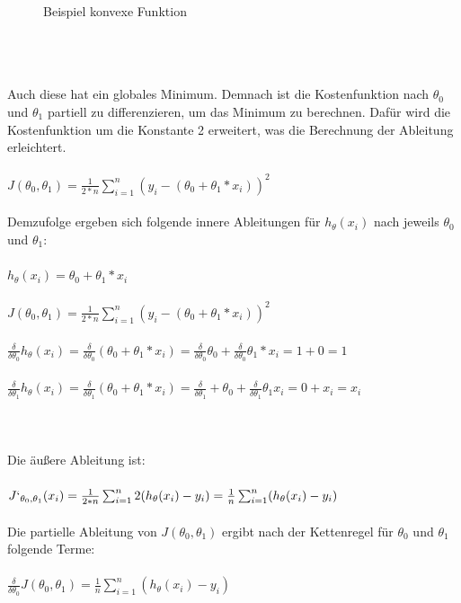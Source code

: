 \documentclass[a4paper]{scrreprt}
\begin{document}
\begin{enumerate}
\begin{figure}[htbp]
\label{Konvexe Funktion}
\caption{Beispiel konvexe Funktion}
\end{figure}\\
\\\\
Auch diese hat ein globales Minimum. Demnach ist die Kostenfunktion nach  $\theta_{0}$ und $\theta_{1}$ partiell zu differenzieren, um das Minimum zu berechnen. Dafür wird die Kostenfunktion um die Konstante 2 erweitert, was die Berechnung der Ableitung erleichtert.\\\\
$J (\theta_{0},\theta_{1})=\frac{1}{2*n}\sum_{i=1}^{n} (y_i-(\theta_{0}+\theta_{1}*x_i))^{2}$\\\\
Demzufolge ergeben sich folgende innere Ableitungen für $h_{\theta}(x_i)$ nach jeweils $\theta_{0}$ und $\theta_{1}$:\\\\
$h_{\theta}(x_i)=\theta_{0}+\theta_{1}*x_i$\\\\
$J (\theta_{0},\theta_{1})= \frac{1}{2*n}\sum_{i=1}^{n} (y_i-(\theta_{0}+\theta_{1}*x_i))^{2}$\\\\
$\frac{\delta}{\delta \theta_{0}} h_{\theta} (x_i)= \frac{\delta}{\delta \theta_{0}} (\theta_{0}+\theta_{1}*x_i)=\frac{\delta}{\delta \theta_{0}} \theta_{0}+\frac{\delta}{\delta \theta_{0}} \theta_{1}*x_i=1+0=1$\\\\
$\frac{\delta}{\delta \theta_{1}} h_{\theta} (x_i)= \frac{\delta}{\delta \theta_{1}} (\theta_{0}+\theta_{1}*x_i)=\frac{\delta}{\delta \theta_{1}}+\theta_{0}+\frac{\delta}{\delta \theta_{1}} \theta_{1}x_i=0+x_i =x_i$\\\\
\\\\
Die äußere Ableitung ist:\\\\
$J`_{\theta_{0},\theta_{1}} (x_i)=\frac{1}{2*n}\sum_{i=1}^{n} 2 (h_{\theta}(x_i)-y_i)= \frac{1}{n}\sum_{i=1}^{n}  (h_{\theta}(x_i)-y_i)$\\\\
Die partielle Ableitung von $J (\theta_{0},\theta_{1})$ ergibt nach der Kettenregel für $\theta_{0}$ und $\theta_{1}$ folgende Terme:\\\\
$\frac{\delta}{\delta \theta_{0}} J(\theta_{0},\theta_{1})= \frac{1}{n}\sum_{i=1}^{n} (h_{\theta} (x_i)-y_i)$\\\\

\end{enumerate}
\end{document}
